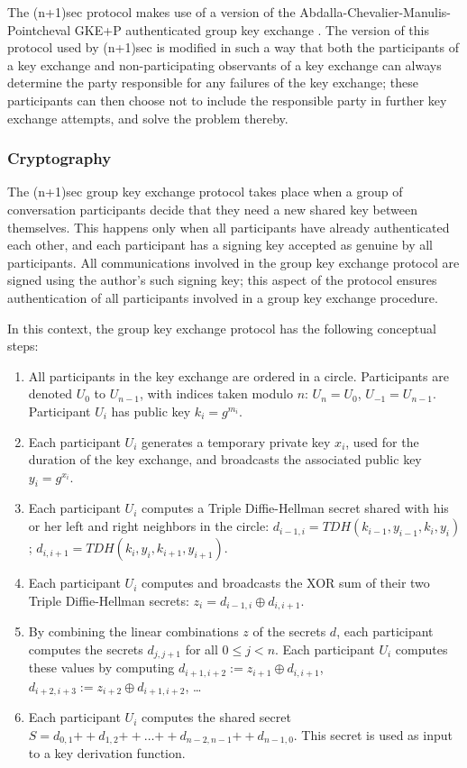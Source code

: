 \documentclass{article}
\def\concat{\mathbin{+\!\!\!+}}
\def\xor{\oplus}
\begin{document}
The (n+1)sec protocol makes use of a version of the Abdalla-Chevalier-Manulis-Pointcheval GKE+P authenticated group key exchange \cite{acmp}.
The version of this protocol used by (n+1)sec is modified in such a way that both the participants of a key exchange and non-participating observants of a key exchange can always determine the party responsible for any failures of the key exchange; these participants can then choose not to include the responsible party in further key exchange attempts, and solve the problem thereby.


\subsubsection{Cryptography}
\label{sec:cryptography/group-key-exchange/cryptography}

The (n+1)sec group key exchange protocol takes place when a group of conversation participants decide that they need a new shared key between themselves.
This happens only when all participants have already authenticated each other, and each participant has a signing key accepted as genuine by all participants.
All communications involved in the group key exchange protocol are signed using the author's such signing key; this aspect of the protocol ensures authentication of all participants involved in a group key exchange procedure.

In this context, the group key exchange protocol has the following conceptual steps:
\begin{enumerate}
\item All participants in the key exchange are ordered in a circle. Participants are denoted $U_0$ to $U_{n-1}$, with indices taken modulo $n$: $U_n = U_0$, $U_{-1} = U_{n-1}$. Participant $U_i$ has public key $k_i = g^{m_i}$.
\item Each participant $U_i$ generates a temporary private key $x_i$, used for the duration of the key exchange, and broadcasts the associated public key $y_i = g^{x_i}$.
\item Each participant $U_i$ computes a Triple Diffie-Hellman secret shared with his or her left and right neighbors in the circle: $d_{i-1, i} = TDH(k_{i-1}, y_{i-1}, k_i, y_i)$; $d_{i, i+1} = TDH(k_i, y_i, k_{i+1}, y_{i+1})$.
\item Each participant $U_i$ computes and broadcasts the XOR sum of their two Triple Diffie-Hellman secrets: $z_i = d_{i-1, i} \xor d_{i, i+1}$.
\item By combining the linear combinations $z$ of the secrets $d$, each participant computes the secrets $d_{j, j+1}$ for all $0 \leq j < n$. Each participant $U_i$ computes these values by computing $d_{i+1, i+2} := z_{i+1} \xor d_{i, i+1}$, $d_{i+2, i+3} := z_{i+2} \xor d_{i+1, i+2}$, \ldots
\item Each participant $U_i$ computes the shared secret $S = d_{0, 1} \concat d_{1, 2} \concat \ldots \concat d_{n-2, n-1} \concat d_{n-1, 0}$. This secret is used as input to a key derivation function.
\end{enumerate}
\end{document}
